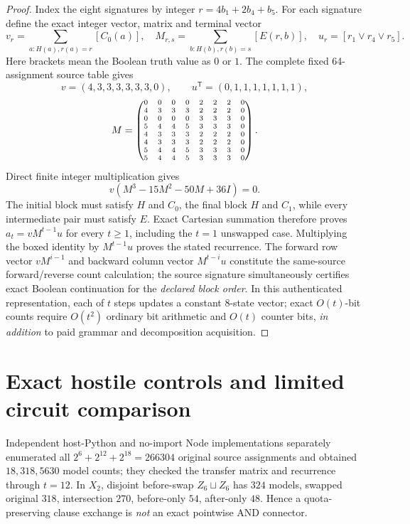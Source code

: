 \documentclass[11pt]{article}
\begin{document}
\begin{proof}
Index the eight signatures by integer $r=4b_1+2b_4+b_5$. For each signature define the exact integer vector, matrix and terminal vector
\[
v_r=\sum_{a:H(a),r(a)=r}[C_0(a)],\quad
M_{r,s}=\sum_{b:H(b),r(b)=s}[E(r,b)],\quad
u_r=[r_1\vee r_4\vee r_5].
\]
Here brackets mean the Boolean truth value as $0$ or $1$. The complete fixed 64-assignment source table gives
\[
v=(4,3,3,3,3,3,3,0),\qquad
u^{\mathsf T}=(0,1,1,1,1,1,1,1),
\]
\[
\scriptsize
M=\begin{pmatrix}
0&0&0&0&2&2&2&0\\
4&3&3&3&2&2&2&0\\
0&0&0&0&3&3&3&0\\
5&4&4&5&3&3&3&0\\
4&3&3&3&2&2&2&0\\
4&3&3&3&2&2&2&0\\
5&4&4&5&3&3&3&0\\
5&4&4&5&3&3&3&0
\end{pmatrix}.
\]
Direct finite integer multiplication gives
\[
\boxed{v(M^3-15M^2-50M+36I)=0}.
\]
The initial block must satisfy $H$ and $C_0$, the final block $H$ and $C_1$, while every intermediate pair must satisfy $E$. Exact Cartesian summation therefore proves $a_t=vM^{t-1}u$ for every $t\ge1$, including the $t=1$ unswapped case. Multiplying the boxed identity by $M^{t-1}u$ proves the stated recurrence. The forward row vector $vM^{i-1}$ and backward column vector $M^{t-i}u$ constitute the same-source forward/reverse count calculation; the source signature simultaneously certifies exact Boolean continuation for the \emph{declared block order}. In this authenticated representation, each of $t$ steps updates a constant 8-state vector; exact $O(t)$-bit counts require $O(t^2)$ ordinary bit arithmetic and $O(t)$ counter bits, \emph{in addition} to paid grammar and decomposition acquisition.
\end{proof}

\section{Exact hostile controls and limited circuit comparison}
Independent host-Python and no-import Node implementations separately enumerated all $2^6+2^{12}+2^{18}=266304$ original source assignments and obtained $18,318,5630$ model counts; they checked the transfer matrix and recurrence through $t=12$. In $X_2$, disjoint before-swap $Z_6\sqcup Z_6$ has $324$ models, swapped original $318$, intersection $270$, before-only $54$, after-only $48$. Hence a quota-preserving clause exchange is \emph{not} an exact pointwise AND connector.
\end{document}

